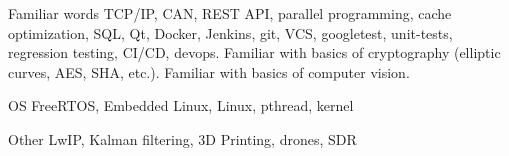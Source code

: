 


\begin{cvskills}


\cvskill
{Familiar words} %
{TCP/IP, CAN, REST API, parallel programming, cache optimization, SQL, Qt, Docker, Jenkins, git, VCS, googletest,
unit-tests, regression testing, CI/CD, devops. 
Familiar with basics of cryptography (elliptic curves, AES, SHA, etc.). Familiar with basics of computer vision.} %


\cvskill
{OS} %
{FreeRTOS, Embedded Linux, Linux, pthread, kernel} %


\cvskill
{Other} %
{LwIP, Kalman filtering, 3D Printing, drones, SDR} %


\end{cvskills}